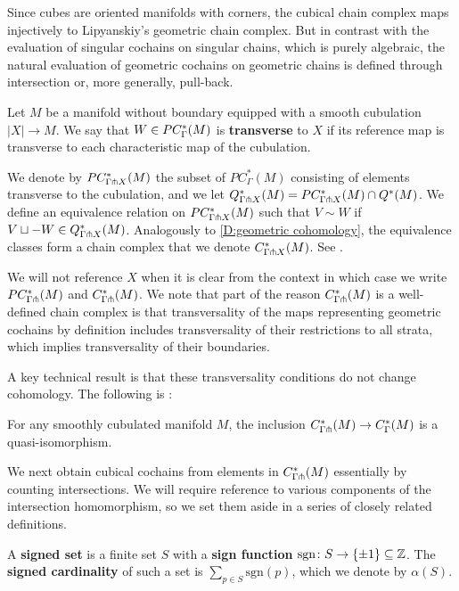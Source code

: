 Since cubes are oriented manifolds with corners, the cubical chain complex maps injectively to Lipyanskiy's geometric chain complex.
But in contrast with the evaluation of singular cochains on singular chains, which is purely algebraic, the natural evaluation of geometric cochains on geometric chains is defined through intersection or, more generally, pull-back.

\begin{definition}
	Let $M$ be a manifold without boundary equipped with a smooth cubulation $|X| \to M$.
	We say that $W \in PC_\Gamma^*(M)$ is \textbf{transverse} to $X$ if its reference map is transverse to each characteristic map of the cubulation.

	We denote by $PC^*_{\Gamma \pitchfork X}(M)$ the subset of $PC_\Gamma^*(M)$ consisting of elements transverse to the cubulation, and we let $Q^*_{\Gamma \pitchfork X}(M) = PC^*_{\Gamma \pitchfork X}(M) \cap Q^*(M)$.
	We define an equivalence relation on $PC^*_{\Gamma \pitchfork X}(M)$ such that $V \sim W$ if $V \sqcup -W \in Q^*_{\Gamma \pitchfork X}(M)$.
	Analogously to \cref{D:geometric cohomology}, the equivalence classes form a chain complex that we denote $C^*_{\Gamma \pitchfork X}(M)$.
	See \cite[Section 6.4]{medina2022foundations}.
\end{definition}

We will not reference $X$ when it is clear from the context in which case we write $PC_{\Gamma \pitchfork}^*(M)$ and $C^*_{\Gamma \pitchfork}(M)$.
We note that part of the reason $C^*_{\Gamma \pitchfork}(M)$ is a well-defined chain complex is that transversality of the maps representing geometric cochains by definition includes transversality of their restrictions to all strata, which implies transversality of their boundaries.

A key technical result is that these transversality conditions do not change cohomology.
The following is \cite[Theorem 6.5]{medina2022foundations}:

\begin{theorem}\label{T:transverse complex}
	For any smoothly cubulated manifold $M$, the inclusion $C^*_{\Gamma \pitchfork}(M) \to C^*_\Gamma(M)$ is a quasi-isomorphism.
\end{theorem}

We next obtain cubical cochains from elements in $C^*_{\Gamma \pitchfork}(M)$ essentially by counting intersections.
We will require reference to various components of the intersection homomorphism, so we set them aside in a series of closely related definitions.

\begin{definition}
	A \textbf{signed set} is a finite set $S$ with a \textbf{sign function} $\mathrm{sgn} \colon S \to \{\pm 1\} \subseteq \mathbb{Z}$.
	The \textbf{signed cardinality} of such a set is $\sum_{p \in S} \mathrm{sgn}(p)$, which we denote by $\alpha(S)$.
\end{definition}

